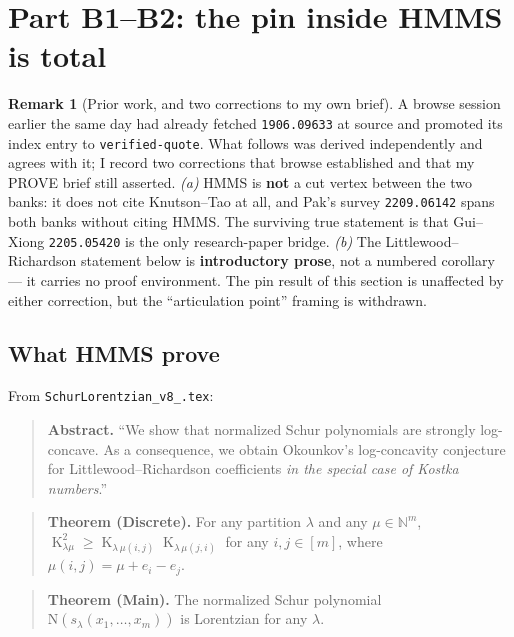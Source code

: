 \documentclass[11pt]{article}
\theoremstyle{definition}
\newtheorem{remark}[theorem]{Remark}
\newcommand{\N}{\mathrm{N}}
\DeclareMathOperator{\Kostka}{K}
\begin{document}
\section{Part B1--B2: the pin inside HMMS is total}

\begin{remark}[Prior work, and two corrections to my own brief]
A browse session earlier the same day had already fetched \texttt{1906.09633} at source
and promoted its index entry to \texttt{verified-quote}. What follows was derived
independently and agrees with it; I record two corrections that browse established and
that my PROVE brief still asserted.
\emph{(a)} HMMS is \textbf{not} a cut vertex between the two banks: it does not cite
Knutson--Tao at all, and Pak's survey \texttt{2209.06142} spans both banks without citing
HMMS. The surviving true statement is that Gui--Xiong \texttt{2205.05420} is the only
research-paper bridge.
\emph{(b)} The Littlewood--Richardson statement below is \textbf{introductory prose}, not a
numbered corollary --- it carries no proof environment. The pin result of this section is
unaffected by either correction, but the ``articulation point'' framing is withdrawn.
\end{remark}

\subsection{What HMMS prove}

From \texttt{SchurLorentzian\_v8\_.tex}:

\begin{quote}
\textbf{Abstract.} ``We show that normalized Schur polynomials are strongly log-concave.
As a consequence, we obtain Okounkov's log-concavity conjecture for Littlewood--Richardson
coefficients \emph{in the special case of Kostka numbers}.''
\end{quote}

\begin{quote}
\textbf{Theorem (Discrete).} For any partition $\lambda$ and any $\mu\in\mathbb{N}^m$,
$\Kostka_{\lambda\mu}^2\ge \Kostka_{\lambda\,\mu(i,j)}\Kostka_{\lambda\,\mu(j,i)}$ for any
$i,j\in[m]$, where $\mu(i,j)=\mu+e_i-e_j$.
\end{quote}

\begin{quote}
\textbf{Theorem (Main).} The normalized Schur polynomial
$\N(s_\lambda(x_1,\dots,x_m))$ is Lorentzian for any $\lambda$.
\end{quote}
\end{document}
